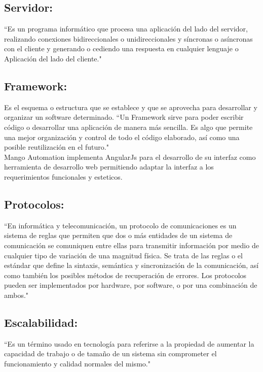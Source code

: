     

\subsection{Servidor:}
    ``Es un programa informático que procesa una aplicación del lado del servidor, realizando conexiones bidireccionales o unidireccionales y síncronas o asíncronas con el cliente y generando o cediendo una respuesta en cualquier lenguaje o Aplicación del lado del cliente."\textcolor{blue}{\cite{Servidor}}
    
\subsection{Framework:} 
    Es el esquema o estructura que se establece y que se aprovecha para desarrollar y organizar un software determinado.
    ``Un Framework sirve para poder escribir código o desarrollar una aplicación de manera más sencilla. Es algo que permite una mejor organización y control de todo el código elaborado, así como una posible reutilización en el futuro."\textcolor{blue}{\cite{Framework}}
    \\
    Mango Automation implementa AngularJs para el desarrollo de su interfaz como herramienta de desarrollo web permitiendo
    adaptar la interfaz a los requerimientos funcionales y esteticos.
\subsection{Protocolos:} ``En informática y telecomunicación, un protocolo de comunicaciones es un sistema de reglas que permiten que dos o más entidades de un sistema de comunicación se comuniquen entre ellas para transmitir información por medio de cualquier tipo de variación de una magnitud física. Se trata de las reglas o el estándar que define la sintaxis, semántica y sincronización de la comunicación, así como también los posibles métodos de recuperación de errores. Los protocolos pueden ser implementados por hardware, por software, o por una combinación de ambos."\textcolor{blue}{\cite{Protocolo}}
	
\subsection{Escalabilidad:} ``Es un término usado en tecnología para referirse a la propiedad de aumentar la capacidad de trabajo o de tamaño de un sistema sin comprometer el funcionamiento y calidad normales del mismo."\textcolor{blue}{\cite{escalabilidad}}
	
